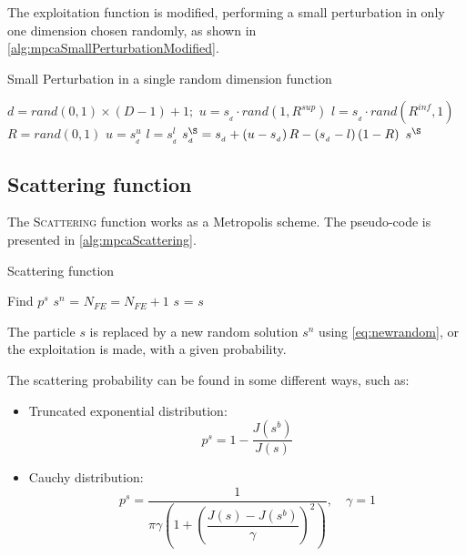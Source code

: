 The exploitation function is modified, performing a small perturbation in only one dimension chosen randomly, as shown in \autoref{alg:mpcaSmallPerturbationModified}.

\begin{algorithm}[H]
\caption{Small Perturbation in a single random dimension function}
\label{alg:mpcaSmallPerturbationModified}
\footnotesize
\begin{algorithmic}[1]
\State $d = rand(0,1) \times (D - 1) + 1;$
\State $u = s_{_d} \cdot rand(1,R^{sup})$
\State $l = s_{_d} \cdot rand(R^{inf},1)$
\State $R = rand(0,1)$
\State $u = s^u_{_d}$
\EndIf
{}
\State $l = s^l_{_d}$
\EndIf
\State $s_{_d}^\S = s_{_d} + \left(u - s_{_d}\right) R- \left(s_{_d} - l\right)\left(1 - R\right)$
\State \Return $s^\S$
\EndFunction
\end{algorithmic}
\end{algorithm}

\subsection{Scattering function}
\label{sec:scattering}

The \textsc{Scattering} function works as a Metropolis scheme. The pseudo-code is presented in \autoref{alg:mpcaScattering}.

\begin{algorithm}[H]
\caption{Scattering function}
\label{alg:mpcaScattering}
\footnotesize
\begin{algorithmic}[1]
\State Find $p^s$
\State $s^n$ = 
\State $N_{FE} = N_{FE} + 1$
\Else
\State $s$ = 
\EndIf
\State \Return $s$
\EndFunction
\end{algorithmic}
\end{algorithm}

The particle $s$ is replaced by a new random solution $s^n$ using \autoref{eq:newrandom}, or the exploitation is made, with a given probability.

The scattering probability can be found in some different ways, such as:

\begin{itemize}
    \item Truncated exponential distribution:
    \begin{equation}
    p^s =1-\dfrac{J(s^b)}{J(s)}
    \end{equation}
    \item Cauchy distribution:
    \begin{equation}
    p^s = \frac{1}{\pi \gamma \left(1 + \left(\dfrac{J(s) - J(s^b)}{\gamma}\right)^2\right)},\quad \gamma = 1
    \end{equation}
\end{itemize}

